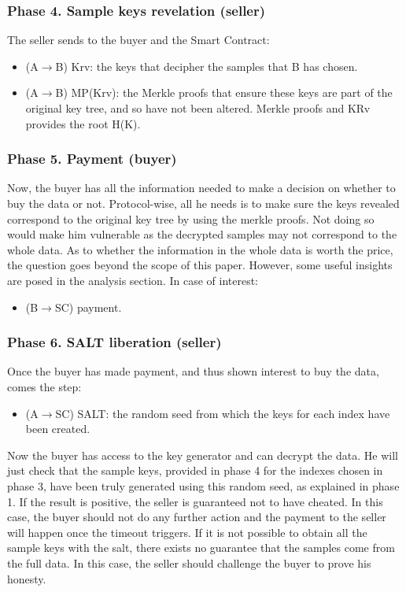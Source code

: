 \documentclass[]{article}
\begin{document}
\subsubsection{Phase 4. Sample keys revelation (seller)}
The seller sends to the buyer and the Smart Contract: 
\begin{itemize}
\item (A$\rightarrow$B) Krv: the keys that decipher the samples that B has chosen.
\item (A$\rightarrow$B) MP(Krv): the Merkle proofs that ensure these keys are part of the original key tree, and so have not been altered.
Merkle proofs and KRv provides the root H(K).  
\end{itemize}

\subsubsection{Phase 5. Payment (buyer)}
Now, the buyer has all the information needed to make a decision on whether to buy the data or not. Protocol-wise, all he needs is to make sure the keys revealed correspond to the original key tree by using the merkle proofs. Not doing so would make him vulnerable as the decrypted samples may not correspond to the whole data. As to whether the information in the whole data is worth the price, the question goes beyond the scope of this paper. However, some useful insights are posed in the analysis section.
In case of interest:
\begin{itemize}
\item (B$\rightarrow$SC) payment.
\end{itemize}

\subsubsection{Phase 6. SALT liberation (seller)}
Once the buyer has made payment, and thus shown interest to buy the data, comes the step:
\begin{itemize}
\item (A$\rightarrow$SC) SALT: the random seed from which the keys for each index have been created.
\end{itemize}
Now the buyer has access to the key generator and can decrypt the data. He will just check that the sample keys, provided in phase 4 for the indexes chosen in phase 3, have been truly generated using this random seed, as explained in phase 1. If the result is positive, the seller is guaranteed not to have cheated. In this case, the buyer should not do any further action and the payment to the seller will happen once the timeout triggers.
If it is not possible to obtain all the sample keys with the salt, there exists no guarantee that the samples come from the full data. In this case, the seller should challenge the buyer to prove his honesty.
\end{document}
